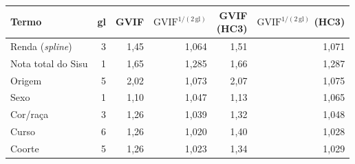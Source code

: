 \begin{tabular}{lrrrrr}
\toprule
Termo & gl & GVIF & $\text{GVIF}^{1/(2\,\text{gl})}$ & \makecell[r]{GVIF\\(HC3)} & \makecell[r]{$\text{GVIF}^{1/(2\,\text{gl})}$\\(HC3)} \\
\midrule
Renda (\textit{spline}) & 3 & 1,45 & 1,064 & 1,51 & 1,071 \\
Nota total do Sisu & 1 & 1,65 & 1,285 & 1,66 & 1,287 \\
Origem & 5 & 2,02 & 1,073 & 2,07 & 1,075 \\
Sexo & 1 & 1,10 & 1,047 & 1,13 & 1,065 \\
Cor/raça & 3 & 1,26 & 1,039 & 1,32 & 1,048 \\
Curso & 6 & 1,26 & 1,020 & 1,40 & 1,028 \\
Coorte & 5 & 1,26 & 1,023 & 1,34 & 1,029 \\
\bottomrule
\end{tabular}
